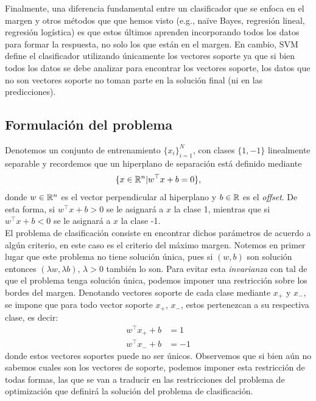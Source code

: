 Finalmente, una diferencia fundamental entre un clasificador que se enfoca en el margen y otros métodos que que hemos visto (e.g., na\"ive Bayes, regresión lineal, regresión logística) es que estos últimos aprenden incorporando todos los datos para formar la respuesta, no solo los que están en el margen. En cambio, SVM define el clasificador utilizando únicamente los vectores soporte ya que si bien todos los datos se debe analizar para encontrar los vectores soporte, los datos que no son vectores soporte no toman parte en la solución final (ni en las predicciones).

\subsection{Formulación del problema}

Denotemos un conjunto de entrenamiento $\{x_i\}_{i=1}^N$, con clases $\{1,-1\}$ linealmente separable y recordemos que un hiperplano de separación está definido mediante
\begin{equation}
    \{x\in \mathbb{R}^n | w^\top x + b = 0 \},\label{ec:hiperplano_svm}
\end{equation}
donde $w\in \mathbb{R}^n$ es el vector perpendicular al hiperplano y $b\in \mathbb{R}$ es el \emph{offset}. De esta forma, si $w^\top x + b >0$ se le asignará a $x$ la clase 1, mientras que si $w^\top x + b <0$ se le asignará a $x$ la clase -1.\\

El problema de clasificación consiste en encontrar dichos parámetros de acuerdo a algún criterio, en este caso es el criterio del máximo margen. Notemos en primer lugar que este problema no tiene solución única, pues si $(w,b)$ son solución entonces $(\lambda w, \lambda b)$, $\lambda>0$ también lo son. Para evitar esta \emph{invarianza} con tal de que el problema tenga solución única, podemos imponer una restricción sobre los bordes del margen. Denotando vectores soporte de cada clase mediante $x_{+}$ y $x_{-}$, se impone que para todo vector soporte $x_+$, $x_-$, estos pertenezcan a su respectiva clase, es decir:
\begin{align}
 	w^\top x_{+} + b &= 1 \label{ec:borde_svm1}\\
 	w^\top x_{-} + b &=  -1\label{ec:borde_svm2}
 \end{align}
 donde estos vectores soportes puede no ser únicos. Observemos que si bien aún no sabemos cuales son los vectores de soporte, podemos imponer esta restricción de todas formas, las que se van a traducir en las restricciones del problema de optimización que definirá la solución del problema de clasificación.\\
 

